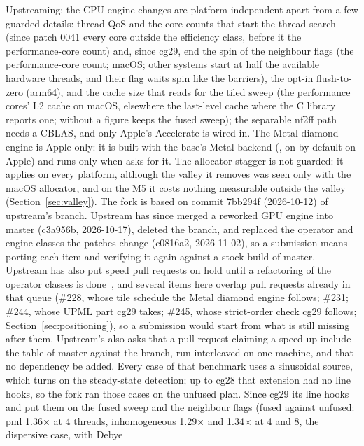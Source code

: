 Upstreaming: the CPU engine changes are platform-independent apart from a few guarded details: thread QoS and the
core counts that start the thread search (since patch 0041 every core outside the efficiency class, before it the
performance-core count) and, since cg29, end the spin of the neighbour flags (the performance-core count; macOS; other
systems start at half the available hardware threads, and their flag waits spin like the barriers), the opt-in
flush-to-zero (arm64), and the cache size that  reads for the tiled sweep (the performance
cores' L2 cache on macOS, elsewhere the last-level cache where the C library reports one; without a figure
 keeps the fused sweep); the separable nf2ff path needs a CBLAS, and only Apple's Accelerate is wired in. The Metal
diamond engine is Apple-only: it is built with the base's Metal backend (, on by default on Apple)
and runs only when  asks for it. The allocator stagger is not guarded: it applies on
every platform, although the valley it removes was seen only with the macOS allocator, and on the M5 it costs nothing
measurable outside the valley (Section~\ref{sec:valley}). The
fork is based on commit 7bb294f (2026-10-12) of upstream's  branch. Upstream has since merged a
reworked GPU engine into master (c3a956b, 2026-10-17), deleted the branch, and replaced the operator and engine
classes the patches change (c0816a2, 2026-11-02), so a submission means porting each item and verifying it again
against a stock build of master. Upstream has also put speed pull requests on hold until a refactoring of the
operator classes is done~\cite{thliebig495}, and several items here overlap pull requests already in that queue
(\#228, whose tile schedule the Metal diamond engine follows; \#231; \#244, whose UPML part cg29 takes; \#245, whose
strict-order check cg29 follows; Section~\ref{sec:positioning}), so a submission would start from what is still
missing after them. Upstream's  also asks that a pull request claiming a speed-up include
the  table of master against the branch, run interleaved on one machine, and that no
dependency be added. Every case of that benchmark uses a sinusoidal source, which turns on the steady-state detection;
up to cg28 that extension had no line hooks, so the fork ran those cases on the unfused plan. Since cg29 its line
hooks and  put them on the fused sweep and the neighbour flags (fused against unfused: pml
1.36$\times$ at 4 threads, inhomogeneous 1.29$\times$ and 1.34$\times$ at 4 and 8, the dispersive case, with Debye
